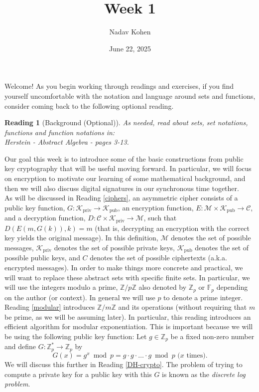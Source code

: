 \documentclass[12pt]{article}
\newcommand{\Z}[0]{\mathbb{Z}}
\newcommand{\F}[0]{\mathbb{F}}
\newcommand{\M}{\mathcal{M}}
\newcommand{\C}{\mathcal{C}}
\newcommand{\Kpriv}{\mathcal{K}_{\text{priv}}}
\newcommand{\Kpub}{\mathcal{K}_{\text{pub}}}
\newtheorem{reading}{Reading}
\theoremstyle{definition}
\theoremstyle{remark}
\theoremstyle{definition}
\begin{document}
\title{Week 1}
\author{Nadav Kohen}
\date{June 22, 2025}
\maketitle

Welcome! As you begin working through readings and exercises, if you find yourself uncomfortable with the notation and language around sets and functions, consider coming back to the following optional reading.

\begin{reading}[Background (Optional)]\label{sets-background}
As needed, read about sets, set notations, functions and  function notations in:\\
Herstein - Abstract Algebra - pages 3-13.
\end{reading}

Our goal this week is to introduce some of the basic constructions from public key cryptography that will be useful moving forward. In particular, we will focus on encryption to motivate our learning of some mathematical background, and then we will also discuss digital signatures in our synchronous time together.\\

As will be discussed in Reading \ref{ciphers}, an asymmetric cipher consists of a public key function, $G: \Kpriv\to\Kpub$, an encryption function, $E: \M\times\Kpub\to\C$, and a decryption function, $D: \C\times\Kpriv\to\M$, such that $D(E(m, G(k)), k) = m$ (that is, decrypting an encryption with the correct key yields the original message). In this definition, $\M$ denotes the set of possible messages, $\Kpriv$ denotes the set of possible private keys, $\Kpub$ denotes the set of possible public keys, and $C$ denotes the set of possible ciphertexts (a.k.a. encrypted messages). In order to make things more concrete and practical, we will want to replace these abstract sets with specific finite sets. In particular, we will use the integers modulo a prime, $\Z/p\Z$ also denoted by $\Z_p$ or $\F_p$ depending on the author (or context). In general we will use $p$ to denote a prime integer.\\

Reading \ref{modular} introduces $\Z/m\Z$ and its operations (without requiring that $m$ be prime, as we will be assuming later). In particular, this reading introduces an efficient algorithm for modular exponentiation. This is important because we will be using the following public key function: Let $g\in\Z_p$ be a fixed non-zero number and define $G: \Z_p^*\to\Z_p$ by
$$G(x) = g^x\bmod p = g\cdot g\cdot\ldots\cdot g\bmod p\text{ (}x\text{ times)}.$$ We will discuss this further in Reading \ref{DH-crypto}. The problem of trying to compute a private key for a public key with this $G$ is known as the \emph{discrete log problem}.
\end{document}
